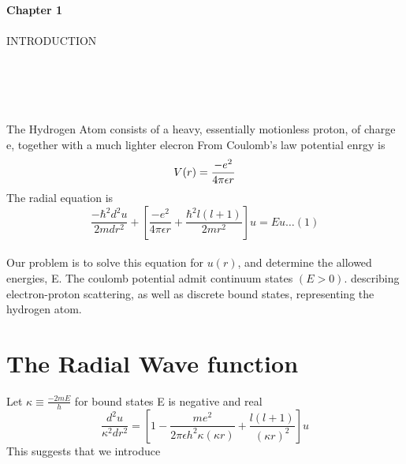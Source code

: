 \documentclass[12pt]{article}
\begin{document}
\begin{center}
\large{{\bf Chapter 1}\\ \\

INTRODUCTION}
\end{center}\\ \\ \\ \\ 
The Hydrogen Atom consists of a heavy, essentially motionless proton, of charge e, together with a much lighter elecron 
From Coulomb's  law potential enrgy is \newline
$$V(r)=\frac{-e^2} {4\pi\epsilon r} \newline$$ 
The radial equation  is 
$$\frac{-\hbar^2 d^2u }{2m dr^2} + \left[\frac{-e^2 }{4\pi\epsilon r} +\frac{{\hbar^2}l(l+1)}{2m r^2}\right]u = Eu     \ldots (1) $$  \\


Our problem is to solve this equation for $u(r)$, and determine the allowed energies, E. The coulomb potential admit continuum states $(E > 0)$.
describing electron-proton scattering, as well as discrete bound states, representing the hydrogen atom.
\\ 

\section{The Radial Wave function}

Let
 $ \kappa \equiv  \frac{-2mE}{h}   $  
for bound states E is negative and real \\
$$ \frac{d^2u}{\kappa^2dr^2} = \left[ 1- \frac{me^2}{2\pi\epsilon h^2 \kappa(\kappa r)}+ \frac{l(l+1)}{(\kappa r)^2} \right]u $$ 
This suggests that we introduce \\
\end{document}
